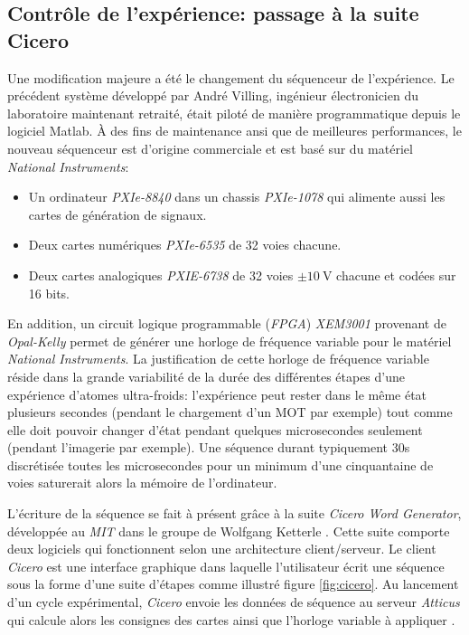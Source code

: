 \subsection{Contrôle de l'expérience: passage à la suite Cicero}
\label{sc:cicero}
Une modification majeure a été le changement du séquenceur de l'expérience. Le précédent système développé par André Villing, ingénieur électronicien du laboratoire maintenant retraité, était piloté de manière programmatique depuis le logiciel Matlab. À des fins de maintenance ansi que de meilleures performances, le nouveau séquenceur est d'origine commerciale et est basé sur du matériel \emph{National Instruments}:
\begin{itemize}
\item[\textendash] Un ordinateur \emph{PXIe-8840} dans un chassis \emph{PXIe-1078} qui alimente aussi les cartes de génération de signaux.
\item[\textendash] Deux cartes numériques \emph{PXIe-6535} de 32 voies chacune.
\item[\textendash] Deux cartes analogiques \emph{PXIE-6738} de 32 voies $\pm \SI{10}{\volt}$ chacune et codées sur 16 bits.
\end{itemize}
En addition, un circuit logique programmable (\emph{FPGA}) \emph{XEM3001} provenant de \emph{Opal-Kelly} permet de générer une horloge de fréquence variable pour le matériel \emph{National Instruments}. La justification de cette horloge de fréquence variable réside dans la grande variabilité de la durée des différentes étapes d'une expérience d'atomes ultra-froids: l'expérience peut rester dans le même état plusieurs secondes (pendant le chargement d'un MOT par exemple) tout comme elle doit pouvoir changer d'état pendant quelques microsecondes seulement (pendant l'imagerie par exemple). Une séquence durant typiquement 30s discrétisée toutes les microsecondes pour un minimum d'une cinquantaine de voies saturerait alors la mémoire de l'ordinateur. 

L'écriture de la séquence se fait à présent grâce à la suite \emph{Cicero Word Generator}, développée au \emph{MIT} dans le groupe de Wolfgang Ketterle \citep{keshet2013distributed}. Cette suite comporte deux logiciels qui fonctionnent selon une architecture client/serveur. Le client \emph{Cicero} est une interface graphique dans laquelle l'utilisateur écrit une séquence sous la forme d'une suite d'étapes comme illustré figure \ref{fig:cicero}. Au lancement d'un cycle expérimental, \emph{Cicero} envoie les données de séquence au serveur \emph{Atticus} qui calcule alors les consignes des cartes ainsi que l'horloge variable à appliquer \citep{keshet2008cicero}.

